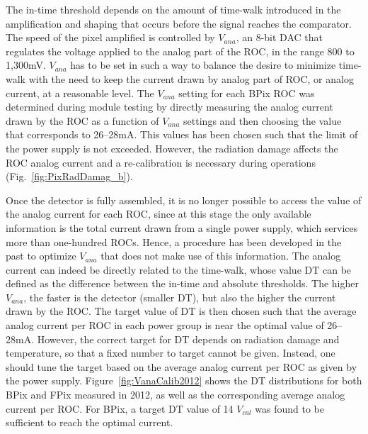 The in-time threshold depends on the amount of time-walk introduced in the amplification and shaping that occurs before the signal reaches the comparator.
The speed of the pixel amplified is controlled by $V_{ana}$, an 8-bit DAC that regulates the voltage applied to the analog part of the ROC, in the range 800 to 1,300\unit{mV}.
$V_{ana}$ has to be set in such a way to balance the desire to minimize time-walk with the need to keep the current drawn by analog part of ROC, or analog current, at a reasonable level.
The $V_{ana}$ setting for each BPix ROC was determined during module testing by directly measuring the analog current drawn by the ROC as a function of $V_{ana}$ settings and then choosing the value that corresponds to 26--28\unit{mA}. This values has been chosen such that the limit of the power supply is not exceeded. However, the radiation damage affects the ROC analog current and a re-calibration is necessary during operations (Fig.~\ref{fig:PixRadDamag_b}). 

Once the detector is fully assembled, it is no longer possible to access the value of the analog current for each ROC, since at this stage the only available information is the total current drawn from a single power supply, which services more than one-hundred ROCs. Hence, a procedure has been developed in the past to optimize $V_{ana}$ that does not make use of this information.
The analog current can indeed be directly related to the time-walk, whose value DT can be defined as the difference between the in-time and absolute thresholds.
The higher $V_{ana}$, the faster is the detector (smaller DT), but also the higher the current drawn by the ROC.
The target value of DT is then chosen such that the average analog current per ROC in each power group is near the optimal value of 26--28\unit{mA}.
However, the correct target for DT depends on radiation damage and temperature, so that a fixed number to target cannot be given.
Instead, one should tune the target based on the average analog current per ROC as given by the power supply.
Figure~\ref{fig:VanaCalib2012} shows the DT distributions for both BPix and FPix measured in 2012, as well as the corresponding average analog current per ROC.
For BPix, a target DT value of 14 $V_{cal}$ was found to be sufficient to reach the optimal current.\\


